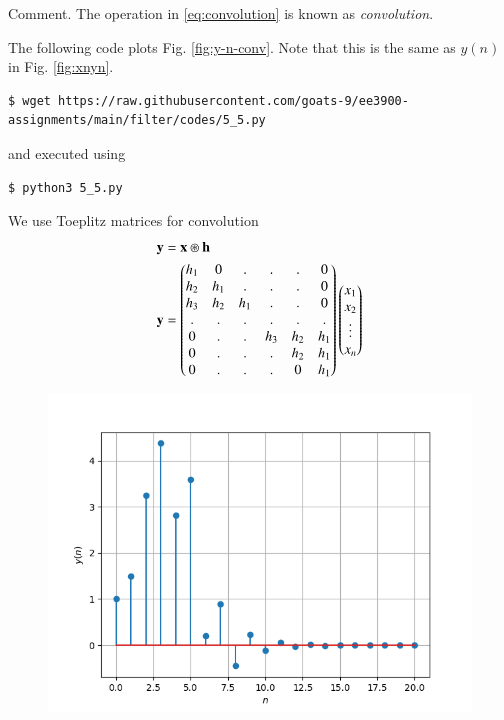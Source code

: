 \documentclass[journal,12pt,twocolumn]{IEEEtran}
\renewcommand\thesection{\arabic{section}}
\begin{document}
\begin{enumerate}[label=\thesection.\arabic*]
Comment. The operation in \eqref{eq:convolution} is known as
{\em convolution}.

\solution The following code plots Fig. \eqref{fig:y-n-conv}. Note that this is
the same as $y(n)$ in  Fig. \eqref{fig:xnyn}.
\begin{lstlisting}
$ wget https://raw.githubusercontent.com/goats-9/ee3900-assignments/main/filter/codes/5_5.py
\end{lstlisting}
and executed using
\begin{lstlisting}
$ python3 5_5.py
\end{lstlisting}
We use Toeplitz matrices for convolution
\begin{align}
	\mathbf{y} &= \mathbf{x} \circledast \mathbf{h}\\
	\mathbf{y} &= 
	\begin{pmatrix}
		h_1 & 0 & . & . & . & 0 \\
		h_2 & h_1 & . & . & . & 0 \\
		h_3 & h_2 & h_1 & . & . & 0 \\
		. & . & . & . & . & . \\
		0 & . & . & h_3 & h_2 & h_1 \\
		0 & . & . & . & h_2 & h_1 \\
		0 & . & . & . & 0 & h_1
	\end{pmatrix}
	\begin{pmatrix}
		x_1 \\ x_2 \\ \vdots \\ x_n
	\end{pmatrix}
\end{align}
\begin{figure}[!ht]
	\centering
	\includegraphics[width=\columnwidth]{figs/5_5.png}

\end{figure}
\end{enumerate}
\end{document}
